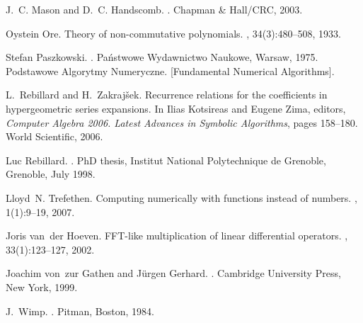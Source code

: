 \documentclass{amsart}
\theoremstyle{definition}
\begin{document}
\begin{thebibliography}{10}
J.~C. Mason and D.~C. Handscomb.
.
\newblock Chapman \& Hall/CRC, 2003.

Oystein Ore.
\newblock Theory of non-commutative polynomials.
, 34(3):480--508, 1933.

Stefan Paszkowski.
.
\newblock Pa\'nstwowe Wydawnictwo Naukowe, Warsaw, 1975.
\newblock Podstawowe Algorytmy Numeryczne. [Fundamental Numerical Algorithms].

L.~Rebillard and H.~Zakraj{\v s}ek.
\newblock Recurrence relations for the coefficients in hypergeometric series
  expansions.
\newblock In Ilias Kotsireas and Eugene Zima, editors, {\em Computer Algebra
  2006. Latest Advances in Symbolic Algorithms}, pages 158--180. World
  Scientific, 2006.

Luc Rebillard.
.
\newblock PhD thesis, Institut National Polytechnique de Grenoble, Grenoble,
  July 1998.

Lloyd~N. Trefethen.
\newblock Computing numerically with functions instead of numbers.
, 1(1):9--19, 2007.

Joris van~der Hoeven.
\newblock F{FT}-like multiplication of linear differential operators.
, 33(1):123--127, 2002.

Joachim von~zur Gathen and J{\"u}rgen Gerhard.
.
\newblock Cambridge University Press, New York, 1999.

J.~Wimp.
.
\newblock Pitman, Boston, 1984.

\end{thebibliography}
\end{document}
